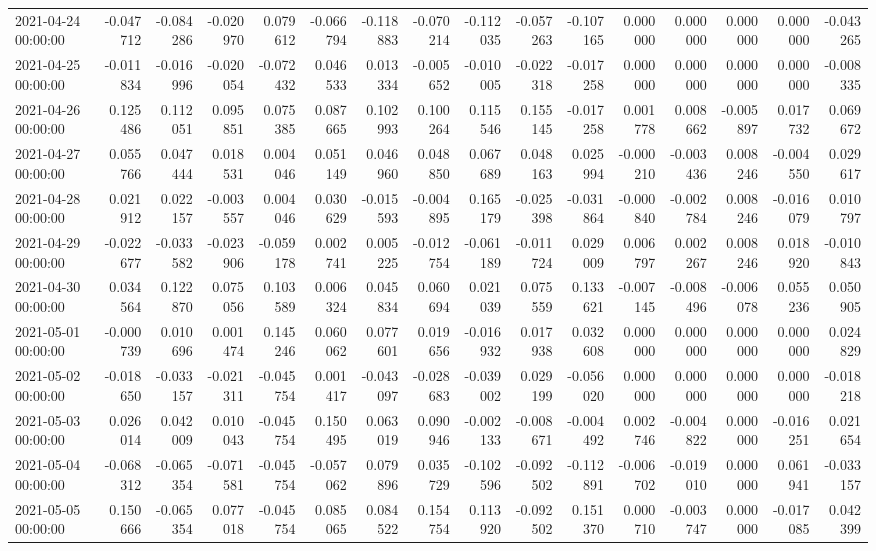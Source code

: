 \begin{tabular}{lrrrrrrrrrrrrrrr}
2021-04-24 00:00:00 & -0.047712 & -0.084286 & -0.020970 & 0.079612 & -0.066794 & -0.118883 & -0.070214 & -0.112035 & -0.057263 & -0.107165 & 0.000000 & 0.000000 & 0.000000 & 0.000000 & -0.043265 \\
2021-04-25 00:00:00 & -0.011834 & -0.016996 & -0.020054 & -0.072432 & 0.046533 & 0.013334 & -0.005652 & -0.010005 & -0.022318 & -0.017258 & 0.000000 & 0.000000 & 0.000000 & 0.000000 & -0.008335 \\
2021-04-26 00:00:00 & 0.125486 & 0.112051 & 0.095851 & 0.075385 & 0.087665 & 0.102993 & 0.100264 & 0.115546 & 0.155145 & -0.017258 & 0.001778 & 0.008662 & -0.005897 & 0.017732 & 0.069672 \\
2021-04-27 00:00:00 & 0.055766 & 0.047444 & 0.018531 & 0.004046 & 0.051149 & 0.046960 & 0.048850 & 0.067689 & 0.048163 & 0.025994 & -0.000210 & -0.003436 & 0.008246 & -0.004550 & 0.029617 \\
2021-04-28 00:00:00 & 0.021912 & 0.022157 & -0.003557 & 0.004046 & 0.030629 & -0.015593 & -0.004895 & 0.165179 & -0.025398 & -0.031864 & -0.000840 & -0.002784 & 0.008246 & -0.016079 & 0.010797 \\
2021-04-29 00:00:00 & -0.022677 & -0.033582 & -0.023906 & -0.059178 & 0.002741 & 0.005225 & -0.012754 & -0.061189 & -0.011724 & 0.029009 & 0.006797 & 0.002267 & 0.008246 & 0.018920 & -0.010843 \\
2021-04-30 00:00:00 & 0.034564 & 0.122870 & 0.075056 & 0.103589 & 0.006324 & 0.045834 & 0.060694 & 0.021039 & 0.075559 & 0.133621 & -0.007145 & -0.008496 & -0.006078 & 0.055236 & 0.050905 \\
2021-05-01 00:00:00 & -0.000739 & 0.010696 & 0.001474 & 0.145246 & 0.060062 & 0.077601 & 0.019656 & -0.016932 & 0.017938 & 0.032608 & 0.000000 & 0.000000 & 0.000000 & 0.000000 & 0.024829 \\
2021-05-02 00:00:00 & -0.018650 & -0.033157 & -0.021311 & -0.045754 & 0.001417 & -0.043097 & -0.028683 & -0.039002 & 0.029199 & -0.056020 & 0.000000 & 0.000000 & 0.000000 & 0.000000 & -0.018218 \\
2021-05-03 00:00:00 & 0.026014 & 0.042009 & 0.010043 & -0.045754 & 0.150495 & 0.063019 & 0.090946 & -0.002133 & -0.008671 & -0.004492 & 0.002746 & -0.004822 & 0.000000 & -0.016251 & 0.021654 \\
2021-05-04 00:00:00 & -0.068312 & -0.065354 & -0.071581 & -0.045754 & -0.057062 & 0.079896 & 0.035729 & -0.102596 & -0.092502 & -0.112891 & -0.006702 & -0.019010 & 0.000000 & 0.061941 & -0.033157 \\
2021-05-05 00:00:00 & 0.150666 & -0.065354 & 0.077018 & -0.045754 & 0.085065 & 0.084522 & 0.154754 & 0.113920 & -0.092502 & 0.151370 & 0.000710 & -0.003747 & 0.000000 & -0.017085 & 0.042399 \\

\end{tabular}
